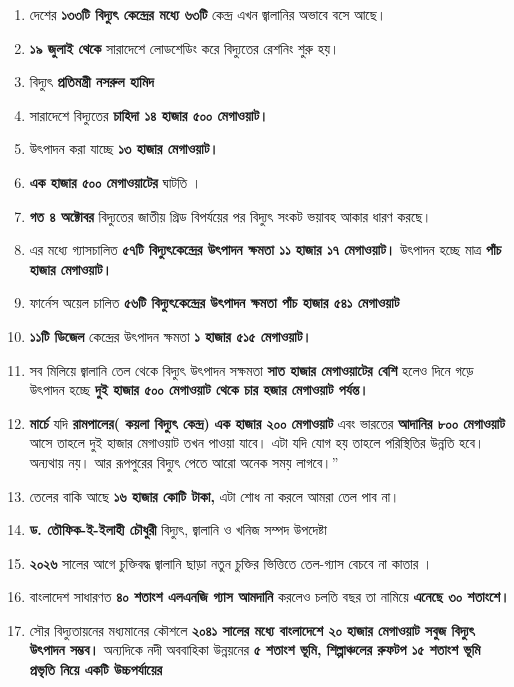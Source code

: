 \documentclass[11pt]{article}
\begin{document}
\begin{enumerate}
\item দেশের \textbf{১৩৩টি বিদ্যুৎ কেন্দ্রের মধ্যে ৬৩টি} কেন্দ্র এখন জ্বালানির অভাবে  বসে আছে।
\item \textbf{১৯ জুলাই থেকে}  সারাদেশে লোডশেডিং করে বিদ্যুতের রেশনিং শুরু হয়।
\item বিদ্যুৎ \textbf{প্রতিমন্ত্রী নসরুল হামিদ}
\item সারাদেশে বিদ্যুতের \textbf{চাহিদা ১৪ হাজার ৫০০ মেগাওয়াট।}
\item উৎপাদন করা যাচ্ছে \textbf{১৩ হাজার মেগাওয়াট।}
\item \textbf{এক হাজার ৫০০ মেগাওয়াটের} ঘাটতি ।
\item \textbf{গত ৪ অক্টোবর} বিদ্যুতের জাতীয় গ্রিড বিপর্যয়ের পর বিদ্যুৎ সংকট
ভয়াবহ আকার ধারণ করছে।
\item এর মধ্যে গ্যাসচালিত \textbf{৫৭টি বিদ্যুৎকেন্দ্রের উৎপাদন ক্ষমতা ১১ হাজার ১৭ মেগাওয়াট।} উৎপাদন হচ্ছে
মাত্র \textbf{পাঁচ হাজার মেগাওয়াট।}
\item ফার্নেস অয়েল চালিত \textbf{৫৬টি বিদ্যুৎকেন্দ্রের উৎপাদন ক্ষমতা পাঁচ হাজার ৫৪১ মেগাওয়াট}
\item \textbf{১১টি ডিজেল} কেন্দ্রের উৎপাদন ক্ষমতা \textbf{১ হাজার ৫১৫ মেগাওয়াট।}
\item সব মিলিয়ে জ্বালানি তেল থেকে বিদ্যুৎ উৎপাদন সক্ষমতা \textbf{সাত হাজার মেগাওয়াটের বেশি}
হলেও দিনে গড়ে উৎপাদন হচ্ছে \textbf{দুই হাজার ৫০০ মেগাওয়াট থেকে চার হজার মেগাওয়াট পর্যন্ত।}
\item \textbf{মার্চে} যদি \textbf{রামপালের( কয়লা বিদ্যুৎ কেন্দ্র)} \textbf{এক হাজার ২০০ মেগাওয়াট} এবং ভারতের \textbf{আদানির
৮০০ মেগাওয়াট} আসে তাহলে দুই হাজার মেগাওয়াট তখন পাওয়া যাবে।
এটা যদি যোগ হয় তাহলে পরিস্থিতির উন্নতি হবে। অন্যথায় নয়।
আর রূপপুরের বিদ্যুৎ পেতে আরো অনেক সময় লাগবে।”
\item তেলের বাকি আছে \textbf{১৬ হাজার কোটি টাকা,} এটা শোধ না করলে আমরা তেল পাব না।
\item \textbf{ড. তৌফিক-ই-ইলাহী চৌধুরী} বিদ্যুৎ, জ্বালানি ও খনিজ সম্পদ উপদেষ্টা
\item \textbf{২০২৬} সালের আগে চুক্তিবদ্ধ জ্বালানি ছাড়া নতুন চুক্তির ভিত্তিতে তেল-গ্যাস বেচবে না কাতার ।
\item বাংলাদেশ সাধারণত \textbf{৪০ শতাংশ এলএনজি গ্যাস আমদানি} করলেও চলতি বছর তা নামিয়ে \textbf{এনেছে ৩০ শতাংশে।}
\item সৌর বিদ্যুতায়নের মধ্যমানের কৌশলে \textbf{২০৪১ সালের মধ্যে বাংলাদেশে ২০ হাজার মেগাওয়াট সবুজ বিদ্যুৎ উৎপাদন সম্ভব।}
অন্যদিকে নদী অববাহিকা উন্নয়নের \textbf{৫ শতাংশ ভূমি, শিল্পাঞ্চলের রুফটপ ১৫ শতাংশ ভূমি প্রভৃতি নিয়ে একটি উচ্চপর্যায়ের
}
\end{enumerate}
\end{document}
